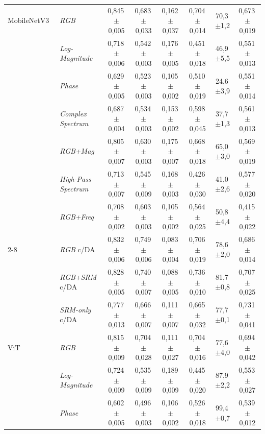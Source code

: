 \documentclass[10pt,conference]{IEEEtran}
\newcommand{\pmsd}[2]{#1\,{\scriptsize$\pm$#2}}
\begin{document}
\begin{table}[!t]
\begin{tabular}{@{}ll ccc ccc@{}}
\midrule
MobileNetV3~\cite{howard2019searching} & \textit{RGB} & \pmsd{0,845}{0,005} & \pmsd{0,683}{0,033} & \pmsd{0,162}{0,037} & \pmsd{0,704}{0,014} & \pmsd{70,3}{1,2} & \pmsd{0,673}{0,019} \\
 & \textit{Log-Magnitude} & \pmsd{0,718}{0,006} & \pmsd{0,542}{0,003} & \pmsd{0,176}{0,005} & \pmsd{0,451}{0,018} & \pmsd{46,9}{5,5} & \pmsd{0,551}{0,013} \\
 & \textit{Phase} & \pmsd{0,629}{0,005} & \pmsd{0,523}{0,003} & \pmsd{0,105}{0,002} & \pmsd{0,510}{0,019} & \pmsd{24,6}{3,9} & \pmsd{0,551}{0,014} \\
 & \textit{Complex Spectrum} & \pmsd{0,687}{0,004} & \pmsd{0,534}{0,003} & \pmsd{0,153}{0,002} & \pmsd{0,598}{0,045} & \pmsd{37,7}{1,3} & \pmsd{0,561}{0,013} \\
 & \textit{RGB+Mag} & \pmsd{0,805}{0,007} & \pmsd{0,630}{0,003} & \pmsd{0,175}{0,007} & \pmsd{0,668}{0,018} & \pmsd{65,0}{3,0} & \pmsd{0,569}{0,019} \\
 & \textit{High-Pass Spectrum} & \pmsd{0,713}{0,007} & \pmsd{0,545}{0,009} & \pmsd{0,168}{0,003} & \pmsd{0,426}{0,030} & \pmsd{41,0}{2,6} & \pmsd{0,577}{0,020} \\
 & \textit{RGB+Freq} & \pmsd{0,708}{0,002} & \pmsd{0,603}{0,003} & \pmsd{0,105}{0,002} & \pmsd{0,564}{0,025} & \pmsd{50,8}{4,4} & \pmsd{0,415}{0,022} \\
 \cmidrule(l){2-8}
 & \textit{RGB} c/DA & \pmsd{0,832}{0,006} & \pmsd{0,749}{0,006} & \pmsd{0,083}{0,004} & \pmsd{0,706}{0,019} & \pmsd{78,6}{2,0} & \pmsd{0,686}{0,014} \\
 & \textit{RGB+SRM} c/DA & \pmsd{0,828}{0,005} & \pmsd{0,740}{0,007} & \pmsd{0,088}{0,005} & \pmsd{0,736}{0,010} & \pmsd{81,7}{0,8} & \pmsd{0,707}{0,025} \\
 & \textit{SRM-only} c/DA & \pmsd{0,777}{0,013} & \pmsd{0,666}{0,007} & \pmsd{0,111}{0,007} & \pmsd{0,665}{0,032} & \pmsd{77,7}{0,1} & \pmsd{0,731}{0,041} \\
\midrule
ViT~\cite{ref_vit} & \textit{RGB} & \pmsd{0,815}{0,009} & \pmsd{0,704}{0,028} & \pmsd{0,111}{0,027} & \pmsd{0,704}{0,016} & \pmsd{77,6}{4,0} & \pmsd{0,694}{0,042} \\
 & \textit{Log-Magnitude} & \pmsd{0,724}{0,009} & \pmsd{0,535}{0,009} & \pmsd{0,189}{0,009} & \pmsd{0,445}{0,020} & \pmsd{87,9}{2,2} & \pmsd{0,553}{0,027} \\
 & \textit{Phase} & \pmsd{0,602}{0,005} & \pmsd{0,496}{0,003} & \pmsd{0,106}{0,002} & \pmsd{0,526}{0,018} & \pmsd{99,4}{0,7} & \pmsd{0,539}{0,012} \\

\end{tabular}
\end{table}
\end{document}
